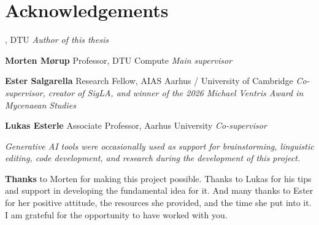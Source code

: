 \chapter{Acknowledgements}

\noindent\textbf{\thesisauthor} \newline
\authorstudy, DTU \newline
\textit{Author of this thesis} \newline

\noindent\textbf{Morten Mørup} \newline
Professor, DTU Compute \newline
\textit{Main supervisor} \newline

\noindent \textbf{Ester Salgarella} \newline
Research Fellow, AIAS Aarhus / University of Cambridge \newline
\textit{Co-supervisor, creator of SigLA, and winner of the 2026 Michael Ventris Award in Mycenaean Studies} \newline

\noindent\textbf{Lukas Esterle} \newline
Associate Professor, Aarhus University \newline
\textit{Co-supervisor} \newline

\noindent\textit{Generative AI tools were occasionally used as support for brainstorming, linguistic editing, code development, and research during the development of this project.} \newline

\noindent \textbf{Thanks} to Morten for making this project possible.
Thanks to Lukas for his tips and support in developing the fundamental idea for it.
And many thanks to Ester for her positive attitude, the resources she provided, and the time she put into it.
I am grateful for the opportunity to have worked with you. \newline
